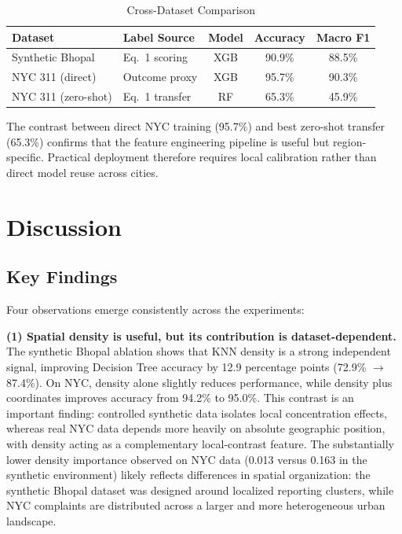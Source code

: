 \documentclass[conference]{IEEEtran}
\begin{document}
\begin{table}[h]
\centering
\caption{Cross-Dataset Comparison}
\label{tab:cross_dataset}
\setlength{\tabcolsep}{3pt}
\begin{tabular}{llccc}
\toprule
Dataset & Label Source & Model & Accuracy & Macro F1 \\
\midrule
Synthetic Bhopal & Eq.~1 scoring & XGB & 90.9\% & 88.5\% \\
NYC 311 (direct) & Outcome proxy & XGB & 95.7\% & 90.3\% \\
NYC 311 (zero-shot) & Eq.~1 transfer & RF & 65.3\% & 45.9\% \\
\bottomrule
\end{tabular}
\end{table}

The contrast between direct NYC training (95.7\%) and best zero-shot transfer (65.3\%) confirms that the feature engineering pipeline is useful but region-specific. Practical deployment therefore requires local calibration rather than direct model reuse across cities.

\section{Discussion}

\subsection{Key Findings}

Four observations emerge consistently across the experiments:

\textbf{(1) Spatial density is useful, but its contribution is dataset-dependent.} The synthetic Bhopal ablation shows that KNN density is a strong independent signal, improving Decision Tree accuracy by 12.9 percentage points (72.9\% $\to$ 87.4\%). On NYC, density alone slightly reduces performance, while density plus coordinates improves accuracy from 94.2\% to 95.0\%. This contrast is an important finding: controlled synthetic data isolates local concentration effects, whereas real NYC data depends more heavily on absolute geographic position, with density acting as a complementary local-contrast feature. The substantially lower density importance observed on NYC data (0.013 versus 0.163 in the synthetic environment) likely reflects differences in spatial organization: the synthetic Bhopal dataset was designed around localized reporting clusters, while NYC complaints are distributed across a larger and more heterogeneous urban landscape.
\end{document}
